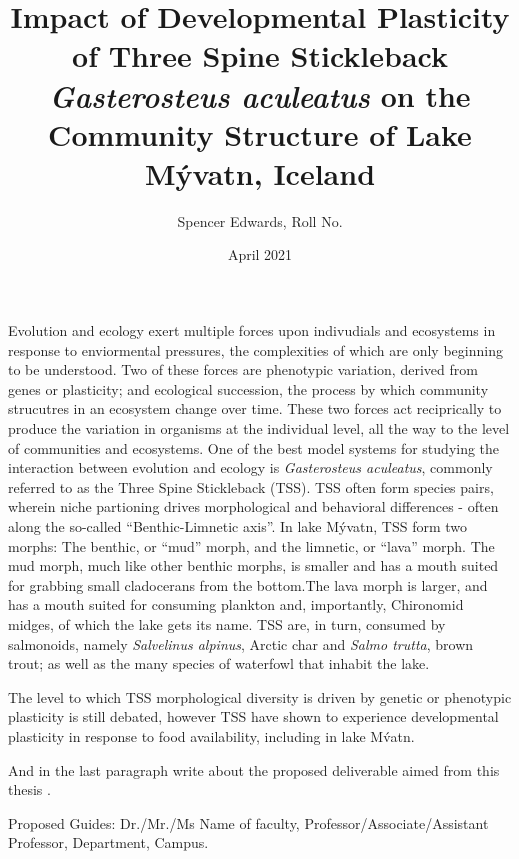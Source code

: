 \documentclass[12pt]{extarticle}
\title{Impact of Developmental Plasticity of Three Spine Stickleback \textit{Gasterosteus aculeatus} on the Community Structure of Lake M\'yvatn, Iceland}
\author{Spencer Edwards, Roll No.}
\date{April 2021}
\begin{document}
\maketitle

Evolution and ecology exert multiple forces upon indivudials and ecosystems in response to enviormental pressures, the complexities of which are only beginning to be understood. Two of these forces are phenotypic variation, derived from genes or plasticity; and ecological succession, the process by which community strucutres in an ecosystem change over time. These two forces act reciprically to produce the variation in organisms at the individual level, all the way to the level of communities and ecosystems. One of the best model systems for studying the interaction between evolution and ecology is \textit{Gasterosteus aculeatus}, commonly referred to as the Three Spine Stickleback (TSS). TSS often form species pairs, wherein niche partioning drives morphological and behavioral differences - often along the so-called ``Benthic-Limnetic axis''. In lake M\'yvatn, TSS form two morphs: The benthic, or ``mud'' morph, and the limnetic, or ``lava'' morph. The mud morph, much like other benthic morphs, is smaller and has a mouth suited for grabbing small cladocerans from the bottom.The lava morph is larger, and has a mouth suited for consuming plankton and, importantly, Chironomid midges, of which the lake gets its name. TSS are, in turn, consumed by salmonoids, namely \textit{Salvelinus alpinus}, Arctic char and \textit{Salmo trutta}, brown trout; as well as the many species of waterfowl that inhabit the lake.

The level to which TSS morphological diversity is driven by genetic or phenotypic plasticity is still debated, however TSS have shown to experience developmental plasticity in response to food availability, including in lake M\'vatn.

And in the last paragraph write about the proposed deliverable aimed from this thesis  \cite{fractalwiki}.

Proposed Guides: Dr./Mr./Ms Name of faculty, Professor/Associate/Assistant Professor, Department, Campus.  \nocite{higham1998handbook}




\end{document}
